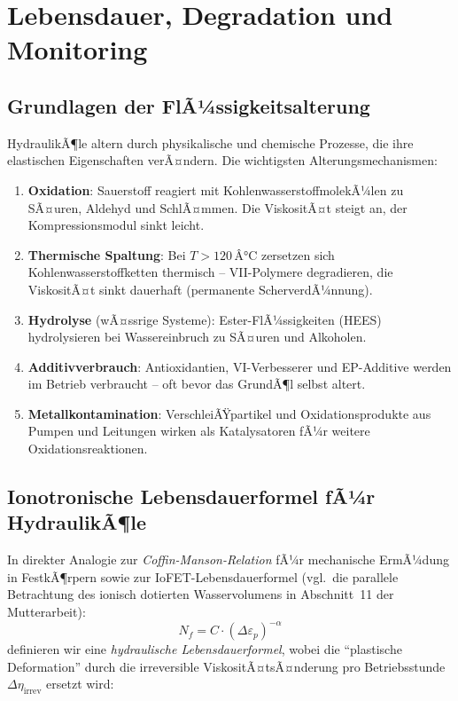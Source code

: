 ﻿\documentclass[a4paper,12pt]{scrreprt}
\theoremstyle{definition}
\begin{document}
\section{Lebensdauer, Degradation und Monitoring}

\subsection{Grundlagen der FlÃ¼ssigkeitsalterung}

HydraulikÃ¶le altern durch physikalische und chemische Prozesse, die
ihre elastischen Eigenschaften verÃ¤ndern. Die wichtigsten Alterungsmechanismen:

\begin{enumerate}
  \item \textbf{Oxidation}: Sauerstoff reagiert mit KohlenwasserstoffmolekÃ¼len
    zu SÃ¤uren, Aldehyd und SchlÃ¤mmen. Die ViskositÃ¤t steigt an,
    der Kompressionsmodul sinkt leicht.
  \item \textbf{Thermische Spaltung}: Bei $T > 120\,Â°\mathrm{C}$ zersetzen
    sich Kohlenwasserstoffketten thermisch -- VII-Polymere degradieren,
    die ViskositÃ¤t sinkt dauerhaft (permanente ScherverdÃ¼nnung).
  \item \textbf{Hydrolyse} (wÃ¤ssrige Systeme): Ester-FlÃ¼ssigkeiten
    (HEES) hydrolysieren bei Wassereinbruch zu SÃ¤uren und Alkoholen.
  \item \textbf{Additivverbrauch}: Antioxidantien, VI-Verbesserer und
    EP-Additive werden im Betrieb verbraucht -- oft bevor das GrundÃ¶l
    selbst altert.
  \item \textbf{Metallkontamination}: VerschleiÃŸpartikel und
    Oxidationsprodukte aus Pumpen und Leitungen wirken als Katalysatoren
    fÃ¼r weitere Oxidationsreaktionen.
\end{enumerate}

\subsection{Ionotronische Lebensdauerformel fÃ¼r HydraulikÃ¶le}

In direkter Analogie zur \emph{Coffin-Manson-Relation} fÃ¼r mechanische
ErmÃ¼dung in FestkÃ¶rpern sowie zur IoFET-Lebensdauerformel (vgl.\ die
parallele Betrachtung des ionisch dotierten Wasservolumens in
Abschnitt~11 der Mutterarbeit):
\begin{equation}
  N_f = C \cdot (\Delta\varepsilon_p)^{-\alpha}
  \label{eq:coffin_manson}
\end{equation}
definieren wir eine \emph{hydraulische Lebensdauerformel}, wobei die
``plastische Deformation'' durch die irreversible ViskositÃ¤tsÃ¤nderung
pro Betriebsstunde $\Delta\eta_{\mathrm{irrev}}$ ersetzt wird:
\end{document}
